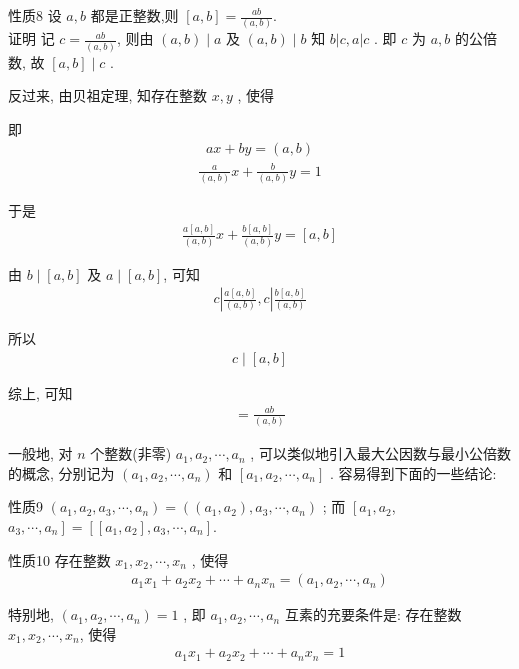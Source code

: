 性质8 设 $a ,  b$ 都是正整数,则 $[a, b]=\frac{a b}{(a, b)}$.\\
证明 记 $c=\frac{a b}{(a, b)}$, 则由 $(a, b) \mid a$ 及 $(a, b) \mid b$ 知 $b|c, a| c$ . 即 $c$ 为 $a ,  b$ 的公倍数, 故 $[a, b] \mid c$ .

反过来, 由贝祖定理, 知存在整数 $x ,  y$ , 使得

即
\begin{align*}
	a x+b y=(a, b)
\end{align*}
\begin{align*}
	\frac{a}{(a, b)} x+\frac{b}{(a, b)} y=1
\end{align*}

于是
\begin{align*}
	\frac{a[a, b]}{(a, b)} x+\frac{b[a, b]}{(a, b)} y=[a, b]
\end{align*}

由 $b \mid[a, b]$ 及 $a \mid[a, b]$, 可知
\begin{align*}
	c\left|\frac{a[a, b]}{(a, b)}, c\right| \frac{b[a, b]}{(a, b)}
\end{align*}

所以
\begin{align*}
	c \mid[a, b]
\end{align*}

综上, 可知
\begin{align*}
	[a, b]=\frac{a b}{(a, b)}
\end{align*}

一般地, 对 $n$ 个整数(非零) $a_{1}, a_{2}, \cdots, a_{n}$ , 可以类似地引入最大公因数与最小公倍数的概念, 分别记为 $\left(a_{1}, a_{2}, \cdots, a_{n}\right)$ 和 $\left[a_{1}, a_{2}, \cdots, a_{n}\right]$ . 容易得到下面的一些结论:

性质9 $\left(a_{1}, a_{2}, a_{3}, \cdots, a_{n}\right)=\left(\left(a_{1}, a_{2}\right), a_{3}, \cdots, a_{n}\right)$ ; 而 $\left[a_{1}, a_{2}\right.$, $\left.a_{3}, \cdots, a_{n}\right]=\left[\left[a_{1}, a_{2}\right], a_{3}, \cdots, a_{n}\right]$.

性质10 存在整数 $x_{1}, x_{2}, \cdots, x_{n}$ , 使得
\begin{align*}
	a_{1} x_{1}+a_{2} x_{2}+\cdots+a_{n} x_{n}=\left(a_{1}, a_{2}, \cdots, a_{n}\right)
\end{align*}

特别地,  $\left(a_{1}, a_{2}, \cdots, a_{n}\right)=1$ , 即 $a_{1}, a_{2}, \cdots, a_{n}$ 互素的充要条件是: 存在整数 $x_{1}, x_{2}, \cdots, x_{n}$, 使得
\begin{align*}
	a_{1} x_{1}+a_{2} x_{2}+\cdots+a_{n} x_{n}=1
\end{align*}

